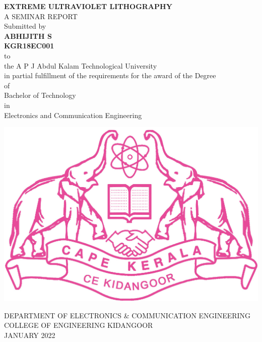 \documentclass[12pt,a4paper]{report}
\begin{document}
\begin{center}
{\Large \textbf{EXTREME ULTRAVIOLET LITHOGRAPHY}}\\
\vspace{2cm}
A SEMINAR REPORT\\
\vspace{0.5cm}
Submitted by \\
\vspace{1cm}
\textbf{ABHIJITH S}\\
\vspace{0.2cm}
\textbf{KGR18EC001}\\
\vspace{0.2cm} to\\


 the A P J Abdul Kalam Technological University \\
in partial fulfillment of the requirements for the award 
of the Degree \\
of\\
Bachelor of Technology \\
in\\
Electronics and Communication Engineering
\end{center}


\begin{center}

\vspace{1.2cm}

\includegraphics[scale=0.3]{ceklogo.jpg}

DEPARTMENT OF ELECTRONICS \& COMMUNICATION ENGINEERING\\

COLLEGE OF ENGINEERING KIDANGOOR\\

JANUARY 2022\\
\end{center}
\end{document}

